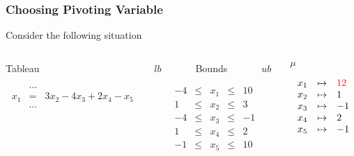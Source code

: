 \begin{frame}
  \frametitle{Choosing Pivoting Variable}

  \scriptsize

  Consider the following situation 
  \vfill
  \begin{columns}

  \begin{column}{.4\textwidth}
  \begin{center}
  Tableau
  \end{center}
  $$
  \begin{array}{rcl}
    & \ldots \\                             
    x_1 & = & 3 x_2 - 4 x_3 + 2 x_4 - x_5 \\ 
    & \ldots \\                             
    \\
    \\
  \end{array}
  $$
  \end{column}

  \begin{column}{.3\textwidth}
  \begin{center}
  $lb$~~~~~~~Bounds~~~~~~~$ub$
  \end{center}
  $$
  \begin{array}{rcccl}
     -4 & \leq & x_1 & \leq & 10 \\
      1 & \leq & x_2 & \leq & 3 \\
     -4 & \leq & x_3 & \leq & -1 \\
      1 & \leq & x_4 & \leq & 2 \\
     -1 & \leq & x_5 & \leq & 10 \\
  \end{array}
  $$
  \end{column}

  \begin{column}{.3\textwidth}
  \begin{center}
  $\mu$
  \end{center}
  $$
  \begin{array}{rcl}
  x_1 & \mapsto & \textcolor{red}{12} \\
  x_2 & \mapsto & 1 \\
  x_3 & \mapsto & -1 \\
  x_4 & \mapsto & 2 \\
  x_5 & \mapsto & -1 
  \end{array}
  $$
  \end{column}


\end{columns}
\end{frame}
